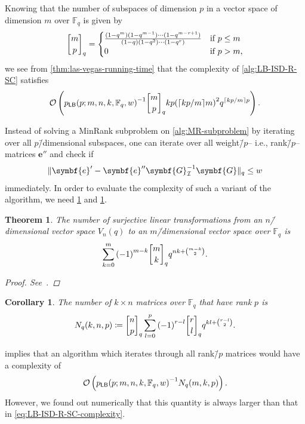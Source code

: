 \documentclass[version=last, paper=A4, parskip=half, oneside,%
toc=bibliography, toc=listof, listof=leveldown]{scrbook}
\theoremstyle{plain}
\newtheorem{theorem}{Theorem}
\newtheorem{corollary}{Corollary}
\theoremstyle{definition}
\theoremstyle{remark}
\renewcommand*{\vec}{\symbf}
\newcommand*{\mat}{\symbf}
\newcommand*{\FF}{\ensuremath{\mathbb{F}}}
\DeclarePairedDelimiter{\ceil}{\lceil}{\rceil}
\DeclarePairedDelimiter{\norm}{\lVert}{\rVert}
\newcommand*{\normR}[2]{\ensuremath{\norm{#1}_{#2}}}
\DeclareRobustCommand{\gbinom}{\genfrac[]{0pt}{}}
\newcommand*{\LB}{\ensuremath{\mathsf{LB}}}
\begin{document}
Knowing that the number of subspaces of dimension \(p\) in a vector space of
dimension \(m\) over \(\FF_q\) is given by
\[
  \gbinom{m}{p}_q =
  \begin{cases}
    \frac{%
      (1 - q^m)(1 - q^{m - 1}) \cdots (1 - q^{m - r + 1})%
    }{%
      (1 - q)(1 - q^2) \cdots (1 - q^r)%
    } & \text{if}\ p \le m \\
    0 & \text{if}\ p > m\text,
  \end{cases}
\]
we see from \cref{thm:las-vegas-running-time} that the complexity of
\cref{alg:LB-ISD-R-SC} satisfies
\begin{equation}\label{eq:LB-ISD-R-SC-complexity}
  \mathcal{O}\left(
    {p_{\LB}(p; m, n, k, \FF_q, w)}^{-1}
    \gbinom{m}{p}_q
    k p {(\ceil{k p / {m}} m)}^2 q^{\ceil{k p / {m}} p}
  \right)\text.
\end{equation}

Instead of solving a MinRank subproblem on \autoref{alg:MR-subproblem} by
iterating over all \(p\)\=/dimensional subspaces, one can iterate over all
weight\=/\(p\)\--- i.e., rank\=/\(p\)\--- matrices \(\vec{e}''\) and check if
\[
  \normR{\vec{e}' - \vec{e}'' \mat{G}_{\mathcal{I}}^{-1} \mat{G}}{q} \le w
\]
immediately.  In order to evaluate the complexity of such a variant of the
algorithm, we need \cref{thm:number-of-surjective-linear-transformations} and
\cref{cor:number-of-matrices-of-given-rank}.

\begin{theorem}\label{thm:number-of-surjective-linear-transformations}
  The number of surjective linear transformations from an \(n\)\=/dimensional
  vector space \(V_n(q)\) to an \(m\)\=/dimensional vector space over \(\FF_q\) is
  \[
    \sum_{k = 0}^m {(-1)}^{m - k} \gbinom{m}{k}_q q^{n k + \binom{m - k}{2}}\text.
  \]
  \begin{proof}
    See~\cite[p.~338]{LW01}.
  \end{proof}
\end{theorem}

\begin{corollary}\label{cor:number-of-matrices-of-given-rank}
  The number of \(k \times n\) matrices over \(\FF_q\) that have rank \(p\) is
  \[
    N_q(k, n, p) \coloneqq
    \gbinom{n}{p}_q \sum_{l = 0}^{p}
    {(-1)}^{r - l} \gbinom{r}{l}_q q^{k l + \binom{r - l}{2}}\text.
  \]
\end{corollary}

 implies that an algorithm which
iterates through all rank\=/\(p\) matrices would have a complexity of
\[
  \mathcal{O}\left(
    {p_{\LB}(p; m, n, k, \FF_q, w)}^{-1} N_q(m, k, p)
  \right)\text.
\]
However, we found out numerically that this quantity is always larger than that
in \cref{eq:LB-ISD-R-SC-complexity}.
\end{document}
